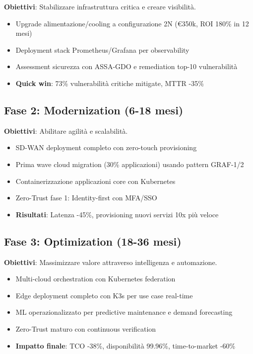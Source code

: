 \textbf{Obiettivi}: Stabilizzare infrastruttura critica e creare visibilità.
\begin{itemize}
\item Upgrade alimentazione/cooling a configurazione 2N (€350k, ROI 180\% in 12 mesi)
\item Deployment stack Prometheus/Grafana per observability
\item Assessment sicurezza con ASSA-GDO e remediation top-10 vulnerabilità
\item \textbf{Quick win}: 73\% vulnerabilità critiche mitigate, MTTR -35\%
\end{itemize}

\subsection{\texorpdfstring{Fase 2: Modernization (6-18 mesi)}{3.7.2 - Fase 2: Modernization (6-18 mesi)}}

\textbf{Obiettivi}: Abilitare agilità e scalabilità.
\begin{itemize}
\item SD-WAN deployment completo con zero-touch provisioning
\item Prima wave cloud migration (30\% applicazioni) usando pattern GRAF-1/2
\item Containerizzazione applicazioni core con Kubernetes
\item Zero-Trust fase 1: Identity-first con MFA/SSO
\item \textbf{Risultati}: Latenza -45\%, provisioning nuovi servizi 10x più veloce
\end{itemize}

\subsection{\texorpdfstring{Fase 3: Optimization (18-36 mesi)}{3.7.3 - Fase 3: Optimization (18-36 mesi)}}

\textbf{Obiettivi}: Massimizzare valore attraverso intelligenza e automazione.
\begin{itemize}
\item Multi-cloud orchestration con Kubernetes federation
\item Edge deployment completo con K3s per use case real-time
\item ML operazionalizzato per predictive maintenance e demand forecasting
\item Zero-Trust maturo con continuous verification
\item \textbf{Impatto finale}: TCO -38\%, disponibilità 99.96\%, time-to-market -60\%
\end{itemize}

